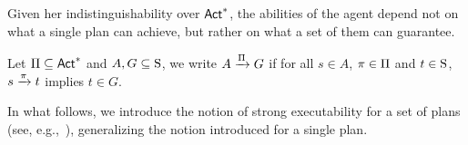 Given her indistinguishability over $\Act^*$, the abilities of the agent depend not on what a single plan can achieve, but rather on what a set of them can guarantee.

\begin{definition}
    Let $\plans \subseteq \Act^*$ and $A,G \subseteq \S$, we write $A\reach{\plans} G$ if for all $s\in A$, $\plan\in\plans$ and $t\in \S$,  $s \reach{\plan} t$ implies $t\in G$. 
\end{definition}

In what follows, we introduce the notion of strong executability for a set of plans (see, e.g.,~\cite{AFSVQ23}), generalizing the notion introduced for a single plan.
    


